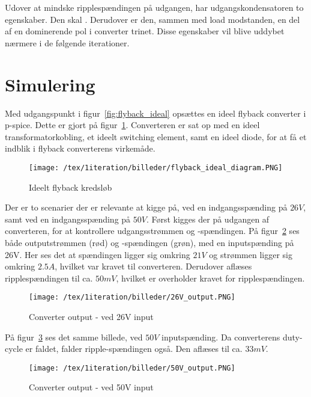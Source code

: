 \noindent Udover at mindske ripplespændingen på udgangen, har udgangskondensatoren to egenskaber. Den skal . Derudover er den, sammen med load modstanden, en del af en dominerende pol i converter trinet. Disse egenskaber vil blive uddybet nærmere i de følgende iterationer. 



\section{Simulering}
Med udgangspunkt i figur~\ref{fig:flyback_ideal} opsættes en ideel flyback converter i p-spice. Dette er gjort på figur~\ref{fig:ideal_flyback_diagram}. Converteren er sat op med en ideel transformatorkobling, et ideelt switching element, samt en ideel diode, for at få et indblik i flyback converterens virkemåde. 


\begin{figure}[H]
	\center
	\texttt{[image: /tex/1iteration/billeder/flyback\_ideal\_diagram.PNG]}
	\caption{Ideelt flyback kredsløb}
	\label{fig:ideal_flyback_diagram}
\end{figure}

Der er to scenarier der er relevante at kigge på, ved en indgangsspænding på $26V$, samt ved en indgangsspænding på $50V$. Først kigges der på udgangen af converteren, for at kontrollere udgangsstrømmen og -spændingen. På figur~\ref{fig:26V_ideal_output} ses både outputstrømmen (rød) og -spændingen (grøn), med en inputspænding på 26V. Her ses det at spændingen ligger sig omkring $21V$ og strømmen ligger sig omkring $2.5A$, hvilket var kravet til converteren. Derudover aflæses ripplespændingen til ca. $50mV$, hvilket er overholder kravet for ripplespændingen. 

\begin{figure}[H]
	\center
	\texttt{[image: /tex/1iteration/billeder/26V\_output.PNG]}
	\caption{Converter output - ved 26V input}
	\label{fig:26V_ideal_output}
\end{figure}

\noindent På figur~\ref{fig:50V_ideal_output} ses det samme billede, ved $50V$ inputspænding. Da converterens duty-cycle er faldet, falder ripple-spændingen også. Den aflæses til ca. $33mV$. 


\begin{figure}[H]
	\center
	\texttt{[image: /tex/1iteration/billeder/50V\_output.PNG]}
	\caption{Converter output - ved 50V input}
	\label{fig:50V_ideal_output}
\end{figure}

